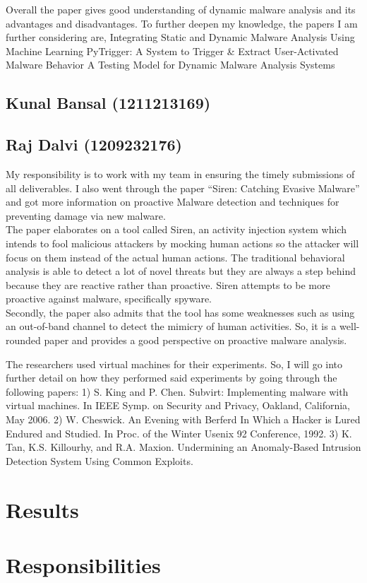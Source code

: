 \documentclass[16pt]{article}
\begin{document}
		Overall the paper gives good understanding of dynamic malware analysis and its advantages and disadvantages. To further deepen my knowledge, the papers I am further considering are,
		Integrating Static and Dynamic Malware Analysis Using Machine Learning
		PyTrigger: A System to Trigger \& Extract User-Activated Malware Behavior
		A Testing Model for Dynamic Malware Analysis Systems
		
		\subsection{Kunal Bansal (1211213169)}
		\subsection{Raj Dalvi (1209232176)}
		My responsibility is to work with my team in ensuring the timely submissions of all deliverables. I also went through the paper “Siren: Catching Evasive Malware” and got more information on proactive Malware detection and techniques for preventing damage via new malware.\\
		The paper elaborates on a tool called Siren, an activity injection system which intends to fool malicious attackers by mocking human actions so the attacker will focus on them instead of the actual human actions. The traditional behavioral analysis is able to detect a lot of novel threats but they are always a step behind because they are reactive rather than proactive. Siren attempts to be more proactive against malware, specifically spyware.\\
		Secondly, the paper also admits that the tool has some weaknesses such as using an out-of-band channel to detect the mimicry of human activities. So, it is a well-rounded paper and provides a good perspective on proactive malware analysis.
		
		The researchers used virtual machines for their experiments. So, I will go into further detail on how they performed said experiments by going through the following papers:
		1) S. King and P. Chen. Subvirt: Implementing malware with virtual machines. In IEEE Symp. on Security and Privacy, Oakland, California, May 2006.
		2) W. Cheswick. An Evening with Berferd In Which a Hacker is Lured Endured and Studied. In Proc. of the Winter Usenix 92 Conference, 1992.
		3) K. Tan, K.S. Killourhy, and R.A. Maxion. Undermining an Anomaly-Based Intrusion Detection System Using Common Exploits.
		
	
	\section{Results}
	
	\section{Responsibilities}
	\begin{table*}[t]
		\centering
		\begin{tabular}{lrrrrrrr}
			\hline
		\end{tabular}
	\end{table*}

\end{document}

